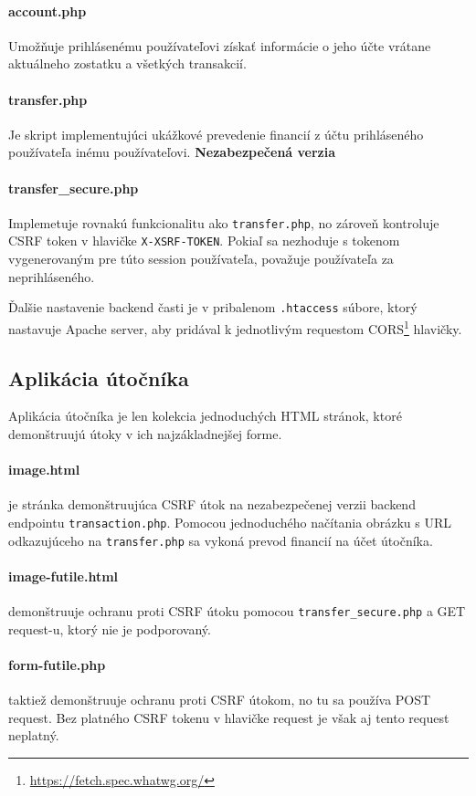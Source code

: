 \documentclass[12pt,a4paper]{article}
\begin{document}
		\paragraph{account.php} Umožňuje prihlásenému používateľovi získať informácie o jeho účte vrátane aktuálneho zostatku a všetkých transakcií. 
		\paragraph{transfer.php} Je skript implementujúci ukážkové prevedenie financií z účtu prihláseného používateľa inému používateľovi. \textbf{Nezabezpečená verzia}
		\paragraph{transfer\_secure.php} Implemetuje rovnakú funkcionalitu ako \texttt{transfer.php}, no zároveň kontroluje CSRF token v hlavičke \texttt{X-XSRF-TOKEN}. Pokiaľ sa nezhoduje s tokenom vygenerovaným pre túto session používateľa, považuje používateľa za neprihláseného.
		
		Ďalšie nastavenie backend časti je v pribalenom \texttt{.htaccess} súbore, ktorý nastavuje Apache server, aby pridával k jednotlivým requestom CORS\footnote{\url{https://fetch.spec.whatwg.org/}} hlavičky.
	
	\subsection{Aplikácia útočníka}
		Aplikácia útočníka je len kolekcia jednoduchých HTML stránok, ktoré demonštruujú útoky v ich najzákladnejšej forme.
		
		\paragraph{image.html} je stránka demonštruujúca CSRF útok na nezabezpečenej verzii backend endpointu \texttt{transaction.php}. Pomocou jednoduchého načítania obrázku s URL odkazujúceho na \texttt{transfer.php} sa vykoná prevod financií na účet útočníka.
		\paragraph{image-futile.html} demonštruuje ochranu proti CSRF útoku pomocou \texttt{transfer\_secure.php} a GET request-u, ktorý nie je podporovaný.
		\paragraph{form-futile.php} taktiež demonštruuje ochranu proti CSRF útokom, no tu sa používa POST request. Bez platného CSRF tokenu v hlavičke request je však aj tento request neplatný.
\end{document}
